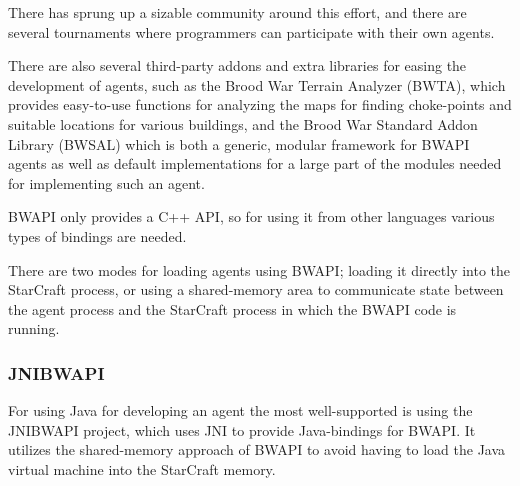 There has sprung up a sizable community around this effort, and there are several tournaments where programmers can participate with their own agents.\cite{bwapi}\cite{sscait}

There are also several third-party addons and extra libraries for easing the development of agents, such as the Brood War Terrain Analyzer (BWTA), which provides easy-to-use functions for analyzing the maps for finding choke-points and suitable locations for various buildings,\cite{bwta} and the Brood War Standard Addon Library (BWSAL) which is both a generic, modular framework for BWAPI agents as well as default implementations for a large part of the modules needed for implementing such an agent.\cite{bwsal}

BWAPI only provides a C++ API, so for using it from other languages various types of bindings are needed.\cite{jnibwapi}

There are two modes for loading agents using BWAPI; loading it directly into the StarCraft process, or using a shared-memory area to communicate state between the agent process and the StarCraft process in which the BWAPI code is running.\cite{bwapi}

\subsubsection{JNIBWAPI}
For using Java for developing an agent the most well-supported is using the JNIBWAPI project, which uses JNI to provide Java-bindings for BWAPI. It utilizes the shared-memory approach of BWAPI to avoid having to load the Java virtual machine into the StarCraft memory.
